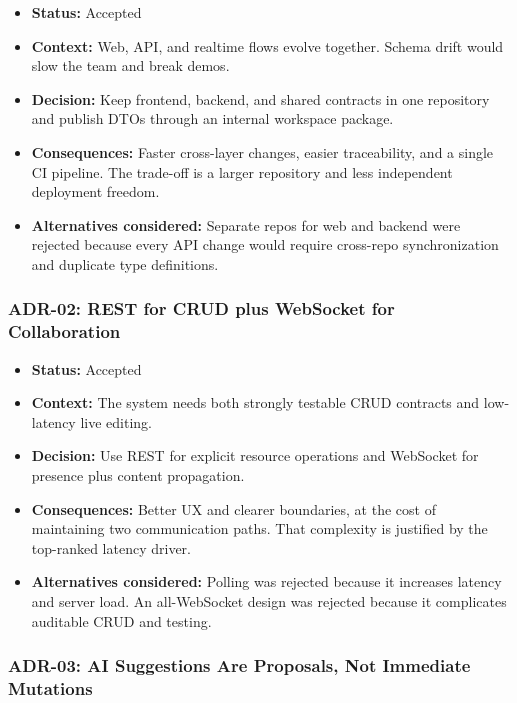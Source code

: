 \begin{itemize}[leftmargin=1.3em]
    \item \textbf{Status:} Accepted
    \item \textbf{Context:} Web, API, and realtime flows evolve together. Schema drift would slow the team and break demos.
    \item \textbf{Decision:} Keep frontend, backend, and shared contracts in one repository and publish DTOs through an internal workspace package.
    \item \textbf{Consequences:} Faster cross-layer changes, easier traceability, and a single CI pipeline. The trade-off is a larger repository and less independent deployment freedom.
    \item \textbf{Alternatives considered:} Separate repos for web and backend were rejected because every API change would require cross-repo synchronization and duplicate type definitions.
\end{itemize}

\subsubsection{ADR-02: REST for CRUD plus WebSocket for Collaboration}

\begin{itemize}[leftmargin=1.3em]
    \item \textbf{Status:} Accepted
    \item \textbf{Context:} The system needs both strongly testable CRUD contracts and low-latency live editing.
    \item \textbf{Decision:} Use REST for explicit resource operations and WebSocket for presence plus content propagation.
    \item \textbf{Consequences:} Better UX and clearer boundaries, at the cost of maintaining two communication paths. That complexity is justified by the top-ranked latency driver.
    \item \textbf{Alternatives considered:} Polling was rejected because it increases latency and server load. An all-WebSocket design was rejected because it complicates auditable CRUD and testing.
\end{itemize}

\subsubsection{ADR-03: AI Suggestions Are Proposals, Not Immediate Mutations}

